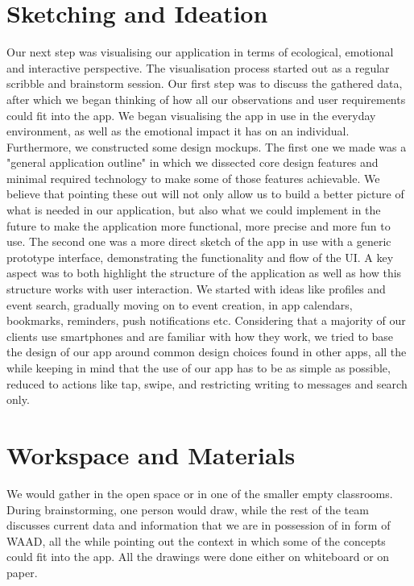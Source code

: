 \documentclass[12pt]{report}
\begin{document}
	\section*{\huge Sketching and Ideation}
	Our next step was visualising our application in terms of ecological, emotional and interactive perspective. The visualisation process started out as a regular scribble and brainstorm session. Our first step was to discuss the gathered data, after which we began thinking of how all our observations and user requirements could fit into the app. We began visualising the app in use in the everyday environment, as well as the emotional impact it has on an individual. Furthermore, we constructed some design mockups. The first one we made was a "general application outline" in which we dissected core design features and minimal required technology to make some of those features achievable. We believe that pointing these out will not only allow us to build a better picture of what is needed in our application, but also what we could implement in the future to make the application more functional, more precise and more fun to use. The second one was a more direct sketch of the app in use with a generic prototype interface, demonstrating the functionality and flow of the UI. A key aspect was to both highlight the structure of the application as well as how this structure works with user interaction. We started with ideas like profiles and event search, gradually moving on to event creation, in app calendars, bookmarks, reminders, push notifications etc. Considering that a majority of our clients use smartphones and are familiar with how they work, we tried to base the design of our app around common design choices found in other apps, all the while keeping in mind that the use of our app has to be as simple as possible, reduced to actions like tap, swipe, and restricting writing to messages and search only.

	\section*{\huge Workspace and Materials}
	We would gather in the open space or in one of the smaller empty classrooms. During brainstorming, one person would draw, while the rest of the team discusses current data and information that we are in possession of in form of WAAD, all the while pointing out the context in which some of the concepts could fit into the app. All the drawings were done either on whiteboard or on paper.
\end{document}
